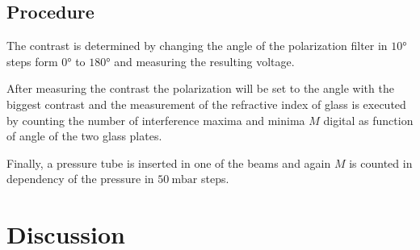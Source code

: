 \subsection{Procedure}
The contrast is determined by changing the angle of the polarization filter in $10°$ steps form $0°$ to $180°$ and measuring the resulting voltage. 

After measuring the contrast the polarization will be set to the angle with the biggest contrast and the measurement of the refractive index of glass 
is executed by counting the number of interference maxima and minima $M$ digital as function of angle of the two glass plates. 

Finally, a pressure tube is inserted in one of the beams and again $M$ is counted in dependency of the pressure in $\qty{50}{\milli\bar}$ steps. 

\newpage



\section{Discussion}


\newpage
\printbibliography

